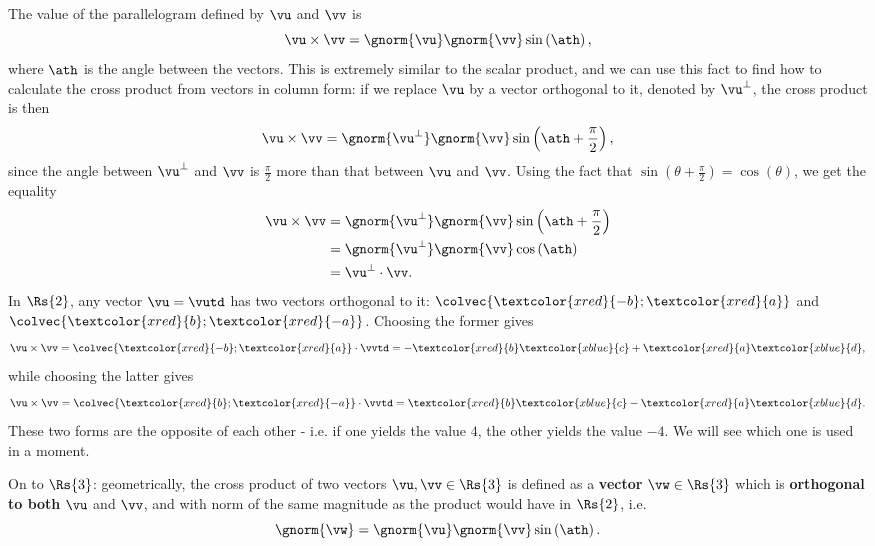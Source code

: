 The value of the parallelogram defined by $\vu$ and $\vv$ is
\begin{equation}
	\vu\times\vv = \gnorm{\vu}\gnorm{\vv}\sin \left( \ath \right),
	\label{eq:cross_product_geometric_area}
\end{equation}
where $\ath$ is the angle between the vectors. This is extremely similar to the scalar product, and we can use this fact to find how to calculate the cross product from vectors in column form: if we replace $\vu$ by a vector orthogonal to it, denoted by $\vu^{\perp}$, the cross product is then
\begin{equation}
	\vu\times\vv = \gnorm{\vu^{\perp}}\gnorm{\vv}\sin \left( \ath+\frac{\pi}{2} \right),
	\label{eq:cross_product_to_dot_product_part1}
\end{equation}
since the angle between $\vu^{\perp}$ and $\vv$ is $\frac{\pi}{2}$ more than that between $\vu$ and $\vv$. Using the fact that $\sin \left( \theta+\frac{\pi}{2} \right) = \cos \left( \theta \right)$, we get the equality
\begin{align}
	\vu\times\vv &= \gnorm{\vu^{\perp}}\gnorm{\vv}\sin \left( \ath+\frac{\pi}{2} \right)\nonumber\\
				 &= \gnorm{\vu^{\perp}}\gnorm{\vv}\cos \left( \ath \right)\nonumber\\
				 &= \vu^{\perp}\cdot\vv.
	\label{eq:cross_product_to_dot_product_part2}
\end{align}
In $\Rs{2}$, any vector $\vu=\vutd$ has two vectors orthogonal to it: $\colvec{\textcolor{xred}{-b};\textcolor{xred}{a}}$ and $\colvec{\textcolor{xred}{b};\textcolor{xred}{-a}}$. Choosing the former gives
\begin{equation}
	\vu\times\vv = \colvec{\textcolor{xred}{-b};\textcolor{xred}{a}} \cdot \vvtd = -\textcolor{xred}{b}\textcolor{xblue}{c}+\textcolor{xred}{a}\textcolor{xblue}{d},
	\label{eq:cross_product_2d_algebraic}
\end{equation}
while choosing the latter gives
\begin{equation}
	\vu\times\vv = \colvec{\textcolor{xred}{b};\textcolor{xred}{-a}} \cdot \vvtd = \textcolor{xred}{b}\textcolor{xblue}{c}-\textcolor{xred}{a}\textcolor{xblue}{d}.
	\label{eq:}
\end{equation}
These two forms are the opposite of each other - i.e. if one yields the value $4$, the other yields the value $-4$. We will see which one is used in a moment.

On to $\Rs{3}$: geometrically, the cross product of two vectors $\vu,\vv\in\Rs{3}$ is defined as a \textbf{vector} $\vw\in\Rs{3}$ which is \textbf{orthogonal to both} $\vu$ and $\vv$, and with norm of the same magnitude as the product would have in $\Rs{2}$, i.e.
\begin{equation}
	\gnorm{\vw} = \gnorm{\vu}\gnorm{\vv}\sin\left(\ath\right).
	\label{eq:cross product geometry}
\end{equation}

